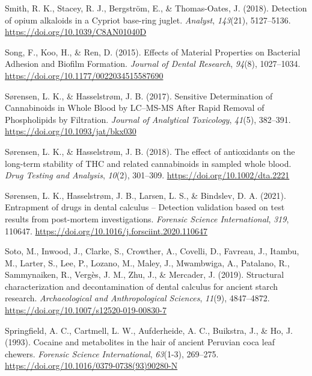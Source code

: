 \documentclass[
  letterpaper,
]{book}
\newlength{\cslhangindent}
\newlength{\cslentryspacingunit} %
\newenvironment{CSLReferences}[2] %
 {%
  \setlength{\parindent}{0pt}
  \ifodd #1
  \let\oldpar\par
  \def\par{\hangindent=\cslhangindent\oldpar}
  \fi
  \setlength{\parskip}{#2\cslentryspacingunit}
 }%
 {}
\begin{document}
\begin{CSLReferences}{1}{0}
\leavevmode{}%
Smith, R. K., Stacey, R. J., Bergström, E., \& Thomas-Oates, J. (2018).
Detection of opium alkaloids in a {Cypriot} base-ring juglet.
\emph{Analyst}, \emph{143}(21), 5127--5136.
\url{https://doi.org/10.1039/C8AN01040D}

\leavevmode{}%
Song, F., Koo, H., \& Ren, D. (2015). Effects of {Material Properties}
on {Bacterial Adhesion} and {Biofilm Formation}. \emph{Journal of Dental
Research}, \emph{94}(8), 1027--1034.
\url{https://doi.org/10.1177/0022034515587690}

\leavevmode{}%
Sørensen, L. K., \& Hasselstrøm, J. B. (2017). Sensitive {Determination}
of {Cannabinoids} in {Whole Blood} by {LC}--{MS-MS After Rapid Removal}
of {Phospholipids} by {Filtration}. \emph{Journal of Analytical
Toxicology}, \emph{41}(5), 382--391.
\url{https://doi.org/10.1093/jat/bkx030}

\leavevmode{}%
Sørensen, L. K., \& Hasselstrøm, J. B. (2018). The effect of
antioxidants on the long-term stability of {THC} and related
cannabinoids in sampled whole blood. \emph{Drug Testing and Analysis},
\emph{10}(2), 301--309. \url{https://doi.org/10.1002/dta.2221}

\leavevmode{}%
Sørensen, L. K., Hasselstrøm, J. B., Larsen, L. S., \& Bindslev, D. A.
(2021). Entrapment of drugs in dental calculus -- {Detection} validation
based on test results from post-mortem investigations. \emph{Forensic
Science International}, \emph{319}, 110647.
\url{https://doi.org/10.1016/j.forsciint.2020.110647}

\leavevmode{}%
Soto, M., Inwood, J., Clarke, S., Crowther, A., Covelli, D., Favreau,
J., Itambu, M., Larter, S., Lee, P., Lozano, M., Maley, J., Mwambwiga,
A., Patalano, R., Sammynaiken, R., Vergès, J. M., Zhu, J., \& Mercader,
J. (2019). Structural characterization and decontamination of dental
calculus for ancient starch research. \emph{Archaeological and
Anthropological Sciences}, \emph{11}(9), 4847--4872.
\url{https://doi.org/10.1007/s12520-019-00830-7}

\leavevmode{}%
Springfield, A. C., Cartmell, L. W., Aufderheide, A. C., Buikstra, J.,
\& Ho, J. (1993). Cocaine and metabolites in the hair of ancient
{Peruvian} coca leaf chewers. \emph{Forensic Science International},
\emph{63}(1-3), 269--275.
\url{https://doi.org/10.1016/0379-0738(93)90280-N}


\end{CSLReferences}
\end{document}
